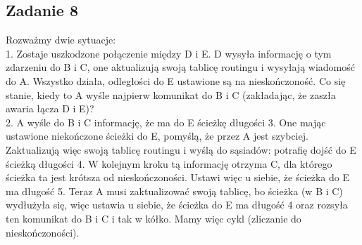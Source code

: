 \documentclass[a4paper]{article}
\begin{document}
\subsection*{Zadanie 8}
Rozważmy dwie sytuacje:\\
1. Zostaje uszkodzone połączenie między D i E. D wysyła informację o tym zdarzeniu do B i C, one aktualizują swoją tablicę routingu i wysyłają wiadomość do A. Wszystko działa, odległości do E ustawione są na nieskończoność.
Co się stanie, kiedy to A wyśle najpierw komunikat do B i C
(zakładając, że zaszła awaria łącza D i E)?\\
2. A wyśle do B i C informację, że ma do E ścieżkę długości 3. One mając ustawione niekończone ścieżki do E, pomyślą, że przez A jest szybciej. Zaktualizują więc swoją tablicę routingu i wyślą do sąsiadów: potrafię dojść do E ścieżką długości 4. W kolejnym kroku tą informację otrzyma C, dla którego ścieżka ta jest krótsza od nieskończoności. Ustawi więc u siebie, że ścieżka do E ma długość 5. Teraz A musi zaktualizować swoją tablicę, bo ścieżka (w B i C) wydłużyła się, więc ustawia u siebie, że ścieżka do E ma długość 4 oraz rozsyła ten komunikat do B i C i tak w kółko. Mamy więc cykl (zliczanie do nieskończoności).
\end{document}
